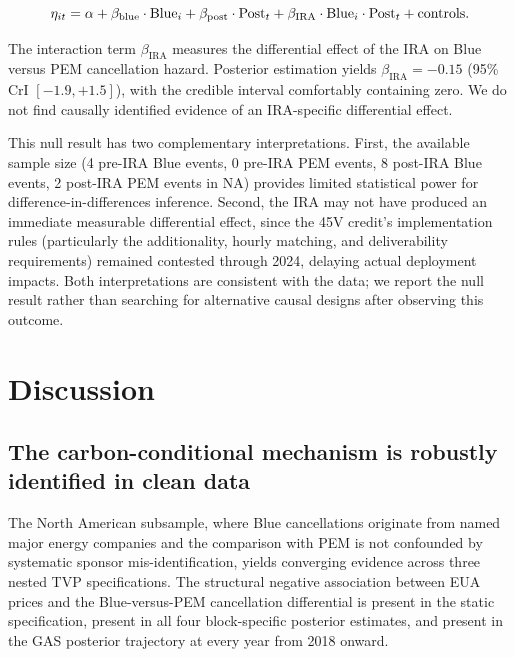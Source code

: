 \begin{equation}
\eta_{it} = \alpha + \beta_{\mathrm{blue}} \cdot \mathrm{Blue}_i + \beta_{\mathrm{post}} \cdot \mathrm{Post}_t + \beta_{\mathrm{IRA}} \cdot \mathrm{Blue}_i \cdot \mathrm{Post}_t + \text{controls}.
\end{equation}

The interaction term $\beta_{\mathrm{IRA}}$ measures the differential effect of the IRA on Blue versus PEM cancellation hazard. Posterior estimation yields $\beta_{\mathrm{IRA}} = -0.15$ (95\% CrI $[-1.9, +1.5]$), with the credible interval comfortably containing zero. We do not find causally identified evidence of an IRA-specific differential effect.

This null result has two complementary interpretations. First, the available sample size (4 pre-IRA Blue events, 0 pre-IRA PEM events, 8 post-IRA Blue events, 2 post-IRA PEM events in NA) provides limited statistical power for difference-in-differences inference. Second, the IRA may not have produced an immediate measurable differential effect, since the 45V credit's implementation rules (particularly the additionality, hourly matching, and deliverability requirements) remained contested through 2024, delaying actual deployment impacts. Both interpretations are consistent with the data; we report the null result rather than searching for alternative causal designs after observing this outcome.

\section{Discussion}
\label{sec:ch7-discussion}

\subsection{The carbon-conditional mechanism is robustly identified in clean data}

The North American subsample, where Blue cancellations originate from named major energy companies and the comparison with PEM is not confounded by systematic sponsor mis-identification, yields converging evidence across three nested TVP specifications. The structural negative association between EUA prices and the Blue-versus-PEM cancellation differential is present in the static specification, present in all four block-specific posterior estimates, and present in the GAS posterior trajectory at every year from 2018 onward.

